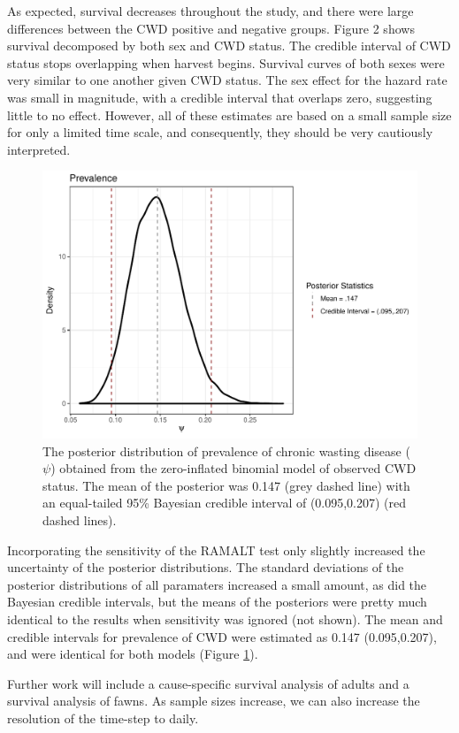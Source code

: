 \documentclass[12pt]{article}\usepackage[]{graphicx}\usepackage[]{color}
\begin{document}
As expected, survival decreases throughout the study, and there were large differences between the CWD positive and negative groups. Figure 2 shows survival decomposed by both sex and CWD status. The credible interval of CWD status stops overlapping when harvest begins. Survival curves of both sexes were very similar to one another given CWD status. The sex effect for the hazard rate was small in magnitude, with a credible interval that overlaps zero, suggesting little to no effect. However, all of these estimates are based on a small sample size for only a limited time scale, and consequently, they should be very cautiously interpreted.

\begin{figure}[H]
\begin{center}
\includegraphics[width=6 in]{figures/Prevalence}
\caption{The posterior distribution of prevalence of chronic wasting disease ($\psi$) obtained from the zero-inflated binomial model of observed CWD status. The mean of the posterior was 0.147 (grey dashed line) with an equal-tailed 95\% Bayesian credible interval of (0.095,0.207) (red dashed lines).}\label{fig:Prevalence}
\end{center}
\end{figure}

Incorporating the sensitivity of the RAMALT test only slightly increased the uncertainty of the posterior distributions. The standard deviations of the posterior distributions of all paramaters increased a small amount, as did the Bayesian credible intervals, but the means of the posteriors were pretty much identical to the results when sensitivity was ignored (not shown). The mean and credible intervals for prevalence of CWD were estimated as 0.147 (0.095,0.207), and were identical for both models (Figure \ref{fig:Prevalence}).

Further work will include a cause-specific survival analysis of adults and a survival analysis of fawns. As sample sizes increase, we can also increase the resolution of the time-step to daily.


\singlespacing

\end{document}
